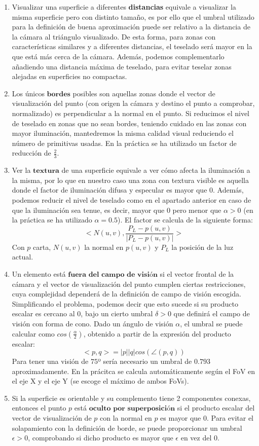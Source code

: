 	\begin{enumerate}
		\item Visualizar una superficie a diferentes \textbf{distancias} equivale a visualizar la misma superficie pero con distinto tamaño, es por ello que el umbral utilizado para la definición de buena aproximación puede ser relativo a la distancia de la cámara al triángulo visualizado. De esta forma, para zonas con características similares y a diferentes distancias, el teselado será mayor en la que está más cerca de la cámara. Además, podemos complementarlo añadiendo una distancia máxima de teselado, para evitar teselar zonas alejadas en superficies no compactas.
		\item Los únicos $\textbf{bordes}$ posibles son aquellas zonas donde el vector de visualización del punto (con origen la cámara y destino el punto a comprobar, normalizado) es perpendicular a la normal en el punto. Si reducimos el nivel de teselado en zonas que no sean bordes, teniendo cuidado en las zonas con mayor iluminación, mantedremos la misma calidad visual reduciendo el número de primitivas usadas. En la práctica se ha utilizado un factor de reducción de $\frac{2}{3}$.
		\item Ver la $\textbf{textura}$ de una superficie equivale a ver cómo afecta la iluminación a la misma, por lo que en nuestro caso una zona con textura visible es aquella donde el factor de iluminación difusa y especular es mayor que $0$. Además, podemos reducir el nivel de teselado como en el apartado anterior en caso de que la iluminación sea tenue, es decir, mayor que $0$ pero menor que $\alpha>0$ (en la práctica se ha utilizado $\alpha = 0.5$). El factor se calcula de la siguiente forma:
		$$<N(u,v),\frac{P_L-p(u,v)}{|P_L-p(u,v)|}>$$
		Con $p$ carta, $N(u,v)$ la normal en $p(u,v)$ y $P_L$ la posición de la luz actual.
		\item Un elemento está $\textbf{fuera del campo de visión}$ si el vector frontal de la cámara y el vector de visualización del punto cumplen ciertas restricciones, cuya complejidad dependerá de la definición de campo de visión escogida. Simplificando el problema, podemos decir que esto sucede si su producto escalar es cercano al $0$, bajo un cierto umbral $\delta>0$ que definirá el campo de visión con forma de cono. Dado un ángulo de visión $\alpha$, el umbral se puede calcular como $cos(\frac{\alpha}{2})$, obtenido a partir de la expresión del producto escalar:
		$$<p,q>=|p||q|cos(\angle(p,q))$$
		Para tener una visión de $75$º sería necesario un umbral de $0.793$ aproximadamente. En la prácitca se calcula automáticamente según el FoV en el eje X y el eje Y (se escoge el máximo de ambos FoVs).
		\item Si la superficie es orientable y su complemento tiene 2 componentes conexas, entonces el punto $p$ está $\textbf{oculto por superposición}$ si el producto escalar del vector de visualización de $p$ con la normal en $p$ es mayor que $0$. Para evitar el solapamiento con la definición de borde, se puede proporcionar un umbral $\epsilon>0$, comprobando si dicho producto es mayor que $\epsilon$ en vez del $0$.
	\end{enumerate}
	
